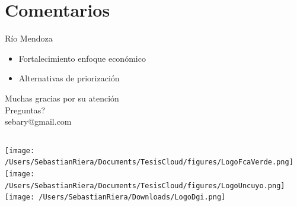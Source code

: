 \documentclass{beamer}\usepackage[]{graphicx}\usepackage[]{color}
\begin{document}
\section*{Comentarios}
\begin{frame}{Río Mendoza}
  \begin{itemize}
  \item Fortalecimiento enfoque económico
\pause \item Alternativas de priorización
  \end{itemize}
\end{frame}



\begin{frame}
  \centering
   Muchas gracias por su atención \\
       \vspace{0.5cm}        \centering
       Preguntas? \\
      sebary@gmail.com
\end{frame}

{
\begin{frame} \vspace*{.5cm}\titlepage  
  \begin{columns}
    \texttt{[image: /Users/SebastianRiera/Documents/TesisCloud/figures/LogoFcaVerde.png]}
    \texttt{[image: /Users/SebastianRiera/Documents/TesisCloud/figures/LogoUncuyo.png]}
    \texttt{[image: /Users/SebastianRiera/Downloads/LogoDgi.png]}
  \end{columns}
\end{frame}
}

\appendix




  
\end{document}
